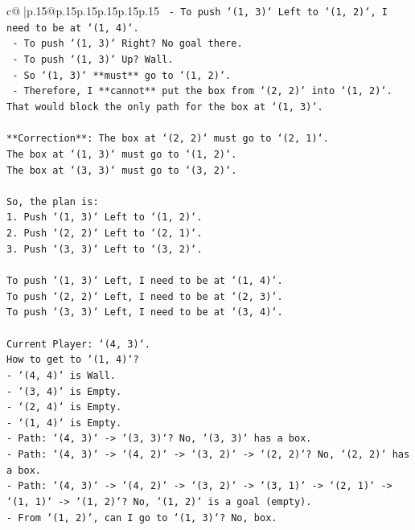 \documentclass{article}
\begin{document}
{\begin{supertabular}{c@{$\;$}|p{.15\linewidth}@{}p{.15\linewidth}p{.15\linewidth}p{.15\linewidth}p{.15\linewidth}p{.15\linewidth}}
{{{\texttt{    {-} To push `(1, 3)` Left to `(1, 2)`, I need to be at `(1, 4)`.} \\
\texttt{    {-} To push `(1, 3)` Right? No goal there.} \\
\texttt{    {-} To push `(1, 3)` Up? Wall.} \\
\texttt{  {-} So `(1, 3)` **must** go to `(1, 2)`.} \\
\texttt{  {-} Therefore, I **cannot** put the box from `(2, 2)` into `(1, 2)`. That would block the only path for the box at `(1, 3)`.} \\
\\ 
\texttt{**Correction**: The box at `(2, 2)` must go to `(2, 1)`.} \\
\texttt{The box at `(1, 3)` must go to `(1, 2)`.} \\
\texttt{The box at `(3, 3)` must go to `(3, 2)`.} \\
\\ 
\texttt{So, the plan is:} \\
\texttt{1. Push `(1, 3)` Left to `(1, 2)`.} \\
\texttt{2. Push `(2, 2)` Left to `(2, 1)`.} \\
\texttt{3. Push `(3, 3)` Left to `(3, 2)`.} \\
\\ 
\texttt{To push `(1, 3)` Left, I need to be at `(1, 4)`.} \\
\texttt{To push `(2, 2)` Left, I need to be at `(2, 3)`.} \\
\texttt{To push `(3, 3)` Left, I need to be at `(3, 4)`.} \\
\\ 
\texttt{Current Player: `(4, 3)`.} \\
\texttt{How to get to `(1, 4)`?} \\
\texttt{{-} `(4, 4)` is Wall.} \\
\texttt{{-} `(3, 4)` is Empty.} \\
\texttt{{-} `(2, 4)` is Empty.} \\
\texttt{{-} `(1, 4)` is Empty.} \\
\texttt{{-} Path: `(4, 3)` {-}> `(3, 3)`? No, `(3, 3)` has a box.} \\
\texttt{{-} Path: `(4, 3)` {-}> `(4, 2)` {-}> `(3, 2)` {-}> `(2, 2)`? No, `(2, 2)` has a box.} \\
\texttt{{-} Path: `(4, 3)` {-}> `(4, 2)` {-}> `(3, 2)` {-}> `(3, 1)` {-}> `(2, 1)` {-}> `(1, 1)` {-}> `(1, 2)`? No, `(1, 2)` is a goal (empty).} \\
\texttt{{-} From `(1, 2)`, can I go to `(1, 3)`? No, box.} \\
}}}
\end{supertabular}}
\end{document}
